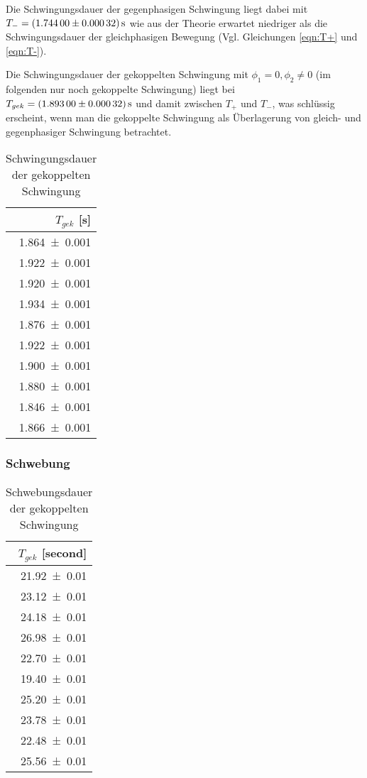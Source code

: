 Die Schwingungsdauer der gegenphasigen Schwingung liegt dabei mit
$T_-=\SI{1.744+-0.00032}{\second}$ wie aus der Theorie erwartet niedriger
als die Schwingungsdauer der gleichphasigen Bewegung
(Vgl. Gleichungen \ref{eqn:T+} und \ref{eqn:T-}).

Die Schwingungsdauer der gekoppelten Schwingung mit $\phi_1=0 , \phi_2\neq 0$
(im folgenden nur noch gekoppelte Schwingung) liegt bei
$T_{gek} = \SI{1.893+-0.00032}{\second}$ und damit zwischen $T_+$ und $T_-$,
was schlüssig erscheint, wenn man die gekoppelte Schwingung als Überlagerung
von gleich- und gegenphasiger Schwingung betrachtet.
\begin{table}[H]
 \centering
 \caption{Schwingungsdauer der gekoppelten
 Schwingung}
 \label{tab:l1tgek}
 \begin{tabular}{r}
 \toprule
  {$T_{gek}$ [\si{\second}]} \\
 \midrule
    \num{1.864 +- 0.001}\\
    \num{1.922 +- 0.001}\\
    \num{1.920 +- 0.001}\\
    \num{1.934 +- 0.001}\\
    \num{1.876 +- 0.001}\\
    \num{1.922 +- 0.001}\\
    \num{1.900 +- 0.001}\\
    \num{1.880 +- 0.001}\\
    \num{1.846 +- 0.001}\\
    \num{1.866 +- 0.001}\\
 \bottomrule
 \end{tabular}
\end{table}

\subsubsection{Schwebung}
\begin{table}[H]
 \centering
 \caption{Schwebungsdauer der gekoppelten
 Schwingung}
 \label{tab:l1tschwebung}
 \begin{tabular}{r}
 \toprule
  {$T_{gek}$ [\si{second}]} \\
 \midrule
    \num{21.92 +- 0.01}\\
    \num{23.12 +- 0.01}\\
    \num{24.18 +- 0.01}\\
    \num{26.98 +- 0.01}\\
    \num{22.70 +- 0.01}\\
    \num{19.40 +- 0.01}\\
    \num{25.20 +- 0.01}\\
    \num{23.78 +- 0.01}\\
    \num{22.48 +- 0.01}\\
    \num{25.56 +- 0.01}\\
 \bottomrule
 \end{tabular}
\end{table}

